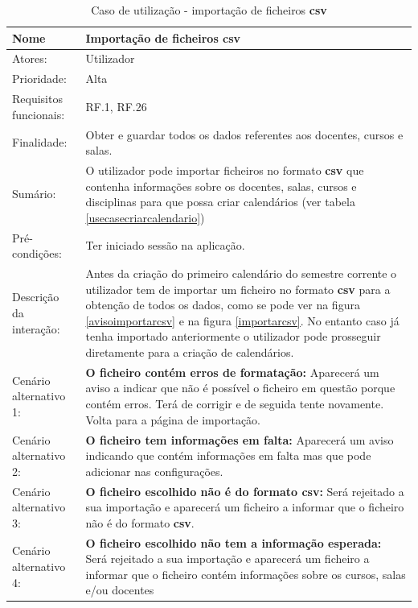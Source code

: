 \documentclass[11pt, twoside]{report}
\begin{document}
\def\arraystretch{1.5}
\begin{table}[H]
	\caption{Caso de utilização - importação de ficheiros \textbf{csv}}
	\label{usecaseimportarcsv}
	\begin{center}	
		\begin{tabularx}{\textwidth}{|l|X|}
			\hline
			\textbf{Nome }	& \textbf{Importação de ficheiros \textbf{csv}} \\
			\hline
			Atores: & Utilizador\\
			\hline
			Prioridade: &  Alta\\
			\hline
			Requisitos funcionais:&  RF.1, RF.26\\
			\hline
			Finalidade: & Obter e guardar todos os dados referentes aos docentes, cursos e salas. \\
			\hline
			Sumário: & O utilizador pode importar ficheiros no formato \textbf{csv} que contenha informações sobre os docentes, salas, cursos e disciplinas para que possa criar calendários (ver tabela \ref{usecasecriarcalendario})\\
			\hline
			Pré-condições: & Ter iniciado sessão na aplicação.\\
			\hline
			Descrição da interação:& Antes da criação do primeiro calendário do semestre corrente o utilizador tem de importar um ficheiro no formato \textbf{csv} para a obtenção de todos os dados, como se pode ver na figura \ref{avisoimportarcsv} e na figura \ref{importarcsv}. No entanto caso já tenha importado anteriormente o utilizador pode prosseguir diretamente para a criação de calendários.\\
			\hline
			Cenário alternativo 1: &\textbf{O ficheiro contém erros de formatação:} Aparecerá um aviso a indicar que não é possível o ficheiro em questão porque contém erros. Terá de corrigir e de seguida tente novamente. Volta para a página de importação.\\
			\hline
			Cenário alternativo 2: &\textbf{O ficheiro tem informações em falta:} Aparecerá um aviso indicando que contém informações em falta mas que pode adicionar nas configurações.\\
			\hline
			Cenário alternativo 3: &\textbf{O ficheiro escolhido não é do formato \textbf{csv}:} Será rejeitado a sua importação e aparecerá um ficheiro a informar que o ficheiro não é do formato \textbf{csv}.\\
			\hline
			Cenário alternativo 4: &\textbf{O ficheiro escolhido não tem a informação esperada:} Será rejeitado a sua importação e aparecerá um ficheiro a informar que o ficheiro contém informações sobre os cursos, salas e/ou docentes\\
			\hline
		\end{tabularx}
	\end{center}
\end{table}
\end{document}
